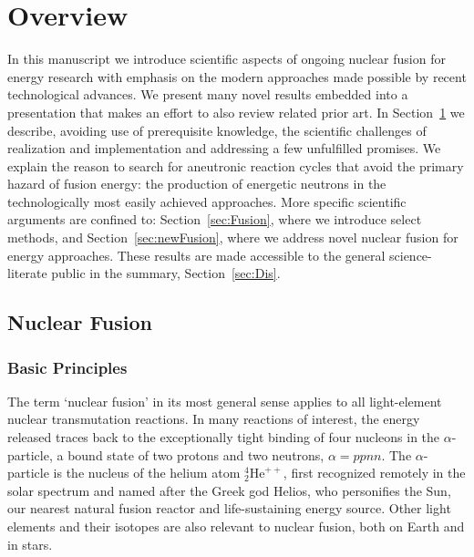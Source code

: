 \documentclass[particles,article,accept,pdftex,moreauthors]{Definitions/mdpi}
\begin{document}
\tableofcontents
\section{Overview}\label{sec:overview}
In this manuscript we introduce scientific aspects of ongoing nuclear fusion for energy research with emphasis on the modern approaches made possible by recent technological advances. We present many novel results embedded into a presentation that makes an effort to also review related prior art. In Section~\ref{sec:overview} we describe, avoiding use of prerequisite knowledge, the scientific challenges of realization and implementation and addressing a few unfulfilled promises. We explain the reason to search for aneutronic reaction cycles that avoid the primary hazard of fusion energy: the production of energetic neutrons in the technologically most easily achieved approaches. More specific scientific arguments are confined to: Section~\ref{sec:Fusion}, where we introduce select methods, and Section~\ref{sec:newFusion}, where we address novel nuclear fusion for energy approaches. These results are made accessible to the general science-literate public in the summary, Section~\ref{sec:Dis}.
\subsection{Nuclear Fusion}\label{ssec:fusion}


\subsubsection{Basic Principles}\label{sssec:basics}
The term `nuclear fusion' in its most general sense applies to all light-element nuclear transmutation reactions. In many reactions of interest, the energy released traces back to the exceptionally tight binding of four nucleons in the $\alpha$-particle, a bound state of two protons and two neutrons, $\alpha=ppnn$. The $\alpha$-particle is the nucleus of the helium atom ${}^{4\!}_{2\!}\mathrm{He}^{++}$, first recognized remotely in the solar spectrum and named after the Greek god Helios, who personifies the Sun, our nearest natural fusion reactor and life-sustaining energy source. Other light elements and their isotopes are also relevant to nuclear fusion, both on Earth and in stars.
\end{document}
